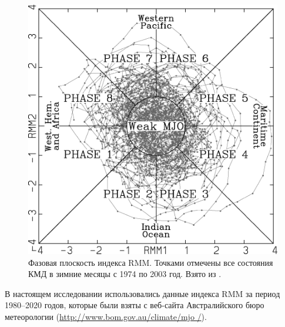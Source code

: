 \begin{figure}[tb]
	\centering
	\includegraphics[width=.49\textwidth]{figures/wh04_fig7.png}
	\caption{Фазовая плоскость индекса RMM. Точками отмечены все состояния КМД в зимние месяцы с 1974 по 2003 год. Взято из \cite[рис. 7]{Wheeler_Hendon_2004}.}
	\label{fig:wh04_fig7}
\end{figure}

В настоящем исследовании использовались данные индекса RMM за период 1980--2020 годов, которые были взяты с веб-сайта Австралийского бюро метеорологии (\url{http://www.bom.gov.au/climate/mjo /}).
